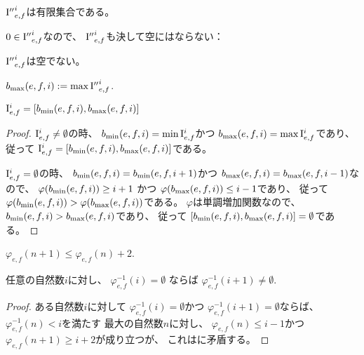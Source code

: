 \begin{lemma}
\label{lm:setI''_finite}
\leanok
${\mathrm{I}''}_{e,f}^i$は有限集合である。
\end{lemma}

$0 \in {\mathrm{I}''}_{e,f}^i$なので、
${\mathrm{I}''}_{e,f}^i$も決して空にはならない：

\begin{lemma}
\label{lm:setI''_non_empty}
\leanok
${\mathrm{I}''}_{e,f}^i$は空でない。
\end{lemma}

\begin{definition}
\label{df:b_max}
\leanok
$b_{\mathrm{max}}(e,f,i) := \max {\mathrm{I}''}_{e,f}^i$.
\end{definition}

\begin{lemma}
\label{lm:I_is_interval}
$\mathrm{I}_{e,f}^i = [b_{\mathrm{min}}(e,f,i),b_{\mathrm{max}}(e,f,i)]$
\end{lemma}

\begin{proof}
$\mathrm{I}_{e,f}^i \ne \emptyset$の時、
$b_{\mathrm{min}}(e,f,i) = \min \mathrm{I}_{e,f}^i$かつ
$b_{\mathrm{max}}(e,f,i) = \max \mathrm{I}_{e,f}^i$であり、
従って
$\mathrm{I}_{e,f}^i = [b_{\mathrm{min}}(e,f,i),b_{\mathrm{max}}(e,f,i)]$である。

$\mathrm{I}_{e,f}^i = \emptyset$の時、
$b_{\mathrm{min}}(e,f,i) = b_{\mathrm{min}}(e,f,i+1)$かつ
$b_{\mathrm{max}}(e,f,i) = b_{\mathrm{max}}(e,f,i-1)$なので、
$\varphi(b_{\mathrm{min}}(e,f,i)) \ge i+1$
かつ
$\varphi(b_{\mathrm{max}}(e,f,i)) \le i-1$であり、
従って
$\varphi(b_{\mathrm{min}}(e,f,i)) > \varphi(b_{\mathrm{max}}(e,f,i))$である。
$\varphi$は単調増加関数なので、
$b_{\mathrm{min}}(e,f,i) > b_{\mathrm{max}}(e,f,i)$であり、
従って
$[b_{\mathrm{min}}(e,f,i),b_{\mathrm{max}}(e,f,i)] = \emptyset$である。
\end{proof}

\begin{lemma} \label{lm:φ_increases_by_2_at_most}
$\varphi_{e,f}(n+1) \le \varphi_{e,f}(n) + 2$.
\end{lemma}

\begin{lemma}
任意の自然数$i$に対し、
$\varphi_{e,f}^{-1}(i) = \emptyset$
ならば
$\varphi_{e,f}^{-1}(i+1) \ne \emptyset$.
\end{lemma}

\begin{proof}
ある自然数$i$に対して
$\varphi_{e,f}^{-1}(i) = \emptyset$かつ
$\varphi_{e,f}^{-1}(i+1) = \emptyset$ならば、
$\varphi_{e,f}^{-1}(n) < i$を満たす
最大の自然数$n$に対し、
$\varphi_{e,f}(n) \le i-1$かつ
$\varphi_{e,f}(n+1) \ge i+2$が成り立つが、
これはに矛盾する。
\end{proof}

